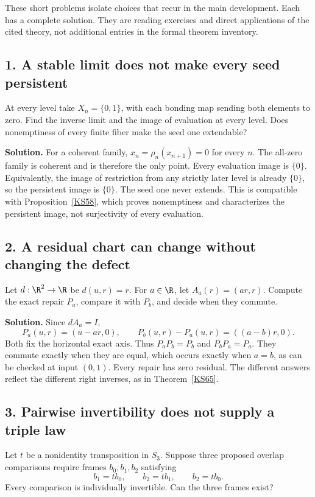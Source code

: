 \clearpage
{}\label{app:workshop}
These short problems isolate choices that recur in the main development. Each has a complete solution. They are reading exercises and direct applications of the cited theory, not additional entries in the formal theorem inventory.

\subsection*{1. A stable limit does not make every seed persistent}
At every level take \(X_n=\{0,1\}\), with each bonding map sending both elements to zero. Find the inverse limit and the image of evaluation at every level. Does nonemptiness of every finite fiber make the seed one extendable?

\textbf{Solution.} For a coherent family, \(x_n=\rho_n(x_{n+1})=0\) for every \(n\). The all-zero family is coherent and is therefore the only point. Every evaluation image is \(\{0\}\). Equivalently, the image of restriction from any strictly later level is already \(\{0\}\), so the persistent image is \(\{0\}\). The seed one never extends. This is compatible with Proposition~\ref{KS58}, which proves nonemptiness and characterizes the persistent image, not surjectivity of every evaluation.

\subsection*{2. A residual chart can change without changing the defect}
Let \(d:\R^2\to\R\) be \(d(u,r)=r\). For \(a\in\R\), let \(A_a(r)=(ar,r)\). Compute the exact repair \(P_a\), compare it with \(P_b\), and decide when they commute.

\textbf{Solution.} Since \(dA_a=I\),
\[
 P_a(u,r)=(u-ar,0),\qquad
 P_b(u,r)-P_a(u,r)=((a-b)r,0).
\]
Both fix the horizontal exact axis. Thus \(P_aP_b=P_b\) and \(P_bP_a=P_a\). They commute exactly when they are equal, which occurs exactly when \(a=b\), as can be checked at input \((0,1)\). Every repair has zero residual. The different answers reflect the different right inverses, as in Theorem~\ref{KS65}.

\subsection*{3. Pairwise invertibility does not supply a triple law}
Let \(t\) be a nonidentity transposition in \(S_3\). Suppose three proposed overlap comparisons require frames \(b_0,b_1,b_2\) satisfying
\[
 b_1=tb_0,\qquad b_2=tb_1,\qquad b_2=tb_0.
\]
Every comparison is individually invertible. Can the three frames exist?

